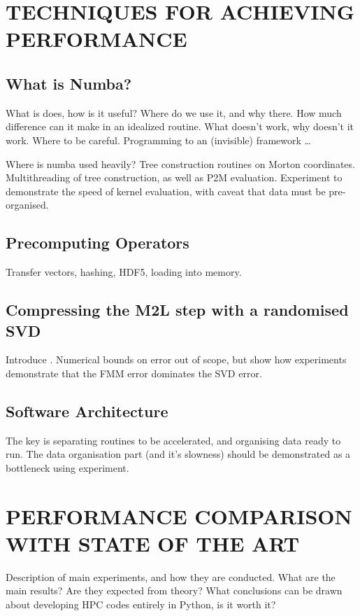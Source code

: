 \documentclass{IEEEcsmag}
\begin{document}
\section{TECHNIQUES FOR ACHIEVING PERFORMANCE}

\subsection{What is Numba?}

What is does, how is it useful? Where do we use it, and why there. How much difference can it make in an idealized routine. What doesn't work, why doesn't it work. Where to be careful. Programming to an (invisible) framework \dots

Where is numba used heavily? Tree construction routines on Morton coordinates. Multithreading of tree construction, as well as P2M evaluation. Experiment to demonstrate the speed of kernel evaluation, with caveat that data must be pre-organised.

\subsection{Precomputing Operators}

Transfer vectors, hashing, HDF5, loading into memory.

\subsection{Compressing the M2L step with a randomised SVD}

Introduce \cite{Ying2004}. Numerical bounds on error out of scope, but show how experiments demonstrate that the FMM error dominates the SVD error.

\subsection{Software Architecture}

The key is separating routines to be accelerated, and organising data ready to run. The data organisation part (and it's slowness) should be demonstrated as a bottleneck using experiment.

\section{PERFORMANCE COMPARISON WITH STATE OF THE ART}

Description of main experiments, and how they are conducted. What are the main results? Are they expected from theory? What conclusions can be drawn about developing HPC codes entirely in Python, is it worth it?
\end{document}
